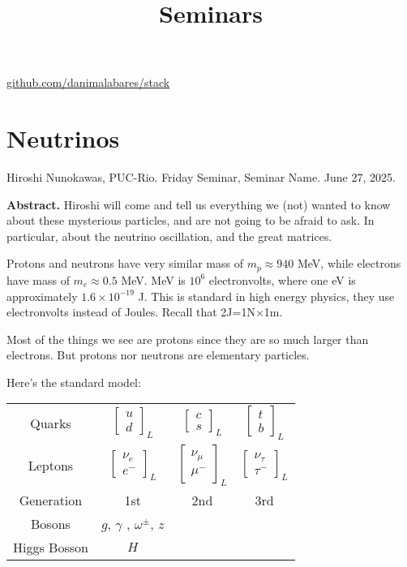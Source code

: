 



\title{Seminars}
\maketitle

\label{section-phantom}
\hfill
\href{http://github.com/danimalabares/stack}{github.com/danimalabares/stack}

\tableofcontents

\section{Neutrinos}
\label{section-neutrinos}

\noindent
Hiroshi Nunokawas, PUC-Rio.
Friday Seminar, Seminar Name. 
June 27, 2025.

\medskip
{\bf Abstract.} Hiroshi will come and tell us everything we (not) wanted to know
about these mysterious particles, and are not going to be afraid to ask. In
particular, about the neutrino oscillation, and the great matrices.

\bigskip\noindent

Protons and neutrons have very similar mass of $m_p\approx 940$ MeV, while
electrons have mass of $m_e \approx 0.5$ MeV. MeV is $10^{6}$ electronvolts,
where one eV is approximately $1.6\times 10^{-19}$ J. This is standard in high
energy physics, they use electronvolts instead of Joules. Recall that
2J=1N$\times$1m.

Most of the things we see are protons since they are so much larger than
electrons. But protons nor neutrons are elementary particles.

Here's the standard model:

\medskip

\begin{tabular}{c c c c}
Quarks & $\begin{bmatrix} u\\d \end{bmatrix}_L $ & $\begin{bmatrix} c\\s
\end{bmatrix}_L$ & $\begin{bmatrix} t\\b \end{bmatrix}_L$\\
Leptons & $\begin{bmatrix} \nu_e\\e^- \end{bmatrix}_L $ & $\begin{bmatrix}
\nu_\mu\\ \mu^-
\end{bmatrix}_L$ & $\begin{bmatrix} \nu_\tau\\ \tau^- \end{bmatrix}_L$\\
Generation & 1st & 2nd & 3rd\\
Bosons & $g$, $\gamma$ , $\omega^\pm$, $z$ \\
Higgs Bosson & $H$
\end{tabular}

